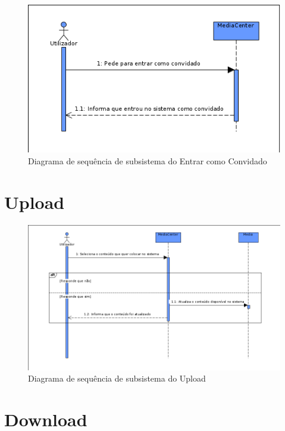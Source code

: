\documentclass[a4paper]{report}
\begin{document}
\begin{figure}[H]
	\centering 
    \includegraphics[width=\textwidth]{images/convidadoSub.png}  
    \caption{Diagrama de sequência de subsistema do Entrar como Convidado}
\end{figure}

\section{Upload}

\begin{figure}[H]
	\centering 
    \includegraphics[width=\textwidth]{images/uploadSub.png}  
    \caption{Diagrama de sequência de subsistema do Upload}
\end{figure}

\section{Download}
\end{document}

